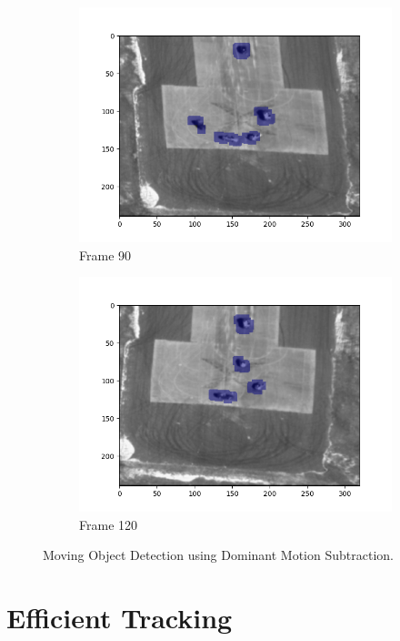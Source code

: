\documentclass{article} %
\begin{document}
\begin{figure}[H]
\begin{subfigure}[b]{0.49\textwidth}
            \includegraphics[width=\textwidth]{q3,3_frame90.png}
            \caption{Frame 90}
        \end{subfigure}
        \begin{subfigure}[b]{0.49\textwidth}
            \centering
            \includegraphics[width=\textwidth]{q3,3_frame120.png}
            \caption{Frame 120}
        \end{subfigure}
        \caption{Moving Object Detection using Dominant Motion Subtraction.}
    \end{figure}

    \section{Efficient Tracking}
\end{document}
